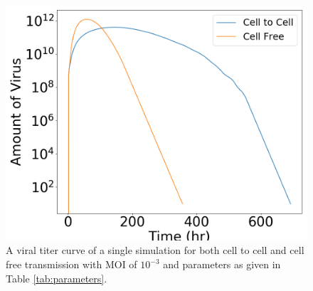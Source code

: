 \documentclass[a4paper]{article}
\begin{document}
\begin{figure}[h]
    \centering
    \includegraphics[width=0.8\linewidth]{Figures/VirusVsTime.png}
    \caption{A viral titer curve of a single simulation for both cell to cell and cell free transmission with MOI of $10^{-3}$ and parameters as given in Table \ref{tab:parameters}.}
    \label{fig:VirusVsTime}
\end{figure}
\end{document}
